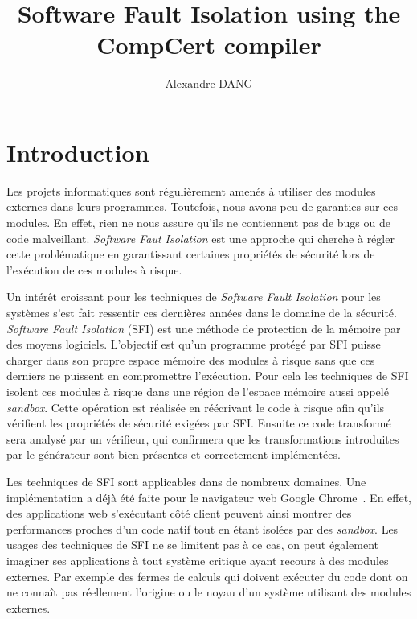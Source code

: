 \documentclass[11pt]{sdm}
\title{Software Fault Isolation using the CompCert compiler}
\author{Alexandre \textsc{DANG}}
\begin{document}
\maketitle


\section{Introduction}


Les projets informatiques sont régulièrement amenés à utiliser des modules externes dans leurs programmes. Toutefois, nous avons peu de garanties sur ces modules. En effet, rien ne nous assure qu'ils ne contiennent pas de bugs ou de code malveillant. \textit{Software Faut Isolation} est une approche qui cherche à régler cette problématique en garantissant certaines propriétés de sécurité lors de l'exécution de ces modules à risque.

Un intérêt croissant pour les techniques de \textit{Software Fault Isolation} pour les systèmes s'est fait ressentir ces dernières années dans le domaine de la sécurité. \textit{Software Fault Isolation} (SFI) est une méthode de protection de la mémoire par des moyens logiciels. L'objectif est qu'un programme protégé par SFI puisse charger dans son propre espace mémoire des modules à risque sans que ces derniers ne puissent en compromettre l'exécution. Pour cela les techniques de SFI isolent ces modules à risque dans une région de l'espace mémoire aussi appelé \textit{sandbox}. Cette opération est réalisée en réécrivant le code à risque afin qu'ils vérifient les propriétés de sécurité exigées par SFI. Ensuite ce code transformé sera analysé par un vérifieur, qui confirmera que les transformations introduites par le générateur sont bien présentes et correctement implémentées.

Les techniques de SFI sont applicables dans de nombreux domaines. Une implémentation a déjà été faite pour le navigateur web Google Chrome~\cite{Yee:2010:NCS:1629175.1629203}\cite{Sehr:2010:ASF:1929820.1929822}. En effet, des applications web s'exécutant côté client peuvent ainsi montrer des performances proches d'un code natif tout en étant isolées par des \textit{sandbox}. Les usages des techniques de SFI ne se limitent pas à ce cas, on peut également imaginer ses applications à tout système critique ayant recours à des modules externes. Par exemple des fermes de calculs qui doivent exécuter du code dont on ne connaît pas réellement l'origine ou le noyau d'un système utilisant des modules externes.
\end{document}
